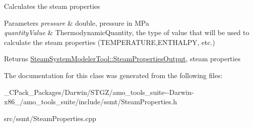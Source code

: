 Calculates the steam properties


\begin{DoxyParams}{Parameters}
{\em pressure} & double, pressure in M\+Pa \\
\hline
{\em quantity\+Value} & Thermodynamic\+Quantity, the type of value that will be used to calculate the steam properties (T\+E\+M\+P\+E\+R\+A\+T\+U\+RE,E\+N\+T\+H\+A\+L\+PY, etc.)\\
\hline
\end{DoxyParams}
\begin{DoxyReturn}{Returns}
\hyperlink{struct_steam_system_modeler_tool_1_1_steam_properties_output}{Steam\+System\+Modeler\+Tool\+::\+Steam\+Properties\+Output}, steam properties 
\end{DoxyReturn}


The documentation for this class was generated from the following files\+:\begin{DoxyCompactItemize}
\item 
\+\_\+\+C\+Pack\+\_\+\+Packages/\+Darwin/\+S\+T\+G\+Z/amo\+\_\+tools\+\_\+suite-\/-\/\+Darwin-\/x86\+\_/amo\+\_\+tools\+\_\+suite/include/ssmt/Steam\+Properties.\+h\item 
src/ssmt/Steam\+Properties.\+cpp\end{DoxyCompactItemize}
